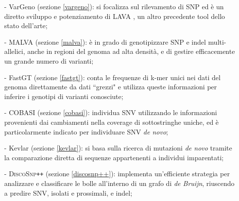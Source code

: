 \documentclass[../main.tex]{subfiles}
\begin{document}
\begin{itemize} 
\item[-] VarGeno (sezione \ref{vargeno}): \cite{sun-medvedev2018vargeno} si focalizza sul rilevamento di SNP ed è un diretto sviluppo e potenziamento di LAVA \cite{shajii2016lava}, un altro precedente tool dello stato dell'arte;
\item[-] MALVA (sezione \ref{malva}): \cite{bernardini2019malva} è in grado di genotipizzare SNP e indel multi-allelici, anche in regioni del genoma ad alta densità, e di gestire efficacemente un grande numero di varianti;
\item[-] FastGT (sezione \ref{fastgt}): \cite{pajuste2017fastgt} conta le frequenze di k-mer unici nei dati del genoma direttamente da dati ``grezzi" e utilizza queste informazioni per inferire i genotipi di varianti conosciute;
\item[-] COBASI (sezione \ref{cobasi}): \cite{gomez-romero2018cobasi} individua SNV utilizzando le informazioni provenienti dai cambiamenti nella coverage di sottostringhe uniche, ed è particolarmente indicato per individuare SNV \textit{de novo};
\item[-] Kevlar (sezione \ref{kevlar}): \cite{standage2019kevlar} si basa sulla ricerca di mutazioni \textit{de novo} tramite la comparazione diretta di sequenze appartenenti a individui imparentati;
\item[-] \textsc{DiscoSnp}\texttt{++} (sezione \ref{discosnp++}): \cite{peterlongo2017discosnp++} implementa un'efficiente strategia per analizzare e classificare le bolle all'interno di un grafo di \textit{de Bruijn}, riuscendo a predire SNV, isolati e prossimali, e indel;
\end{itemize} 
\end{document}
